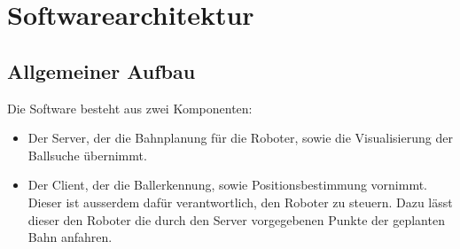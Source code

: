 
\chapter{Softwarearchitektur}
\label{cha:softwarearchitektur}

\section{Allgemeiner Aufbau}
\label{sec:allgemeiner-aufbau}

Die Software besteht aus zwei Komponenten:
\begin{itemize}
\item Der Server, der die Bahnplanung für die Roboter, sowie die
  Visualisierung der Ballsuche übernimmt.
\item Der Client, der die Ballerkennung, sowie Positionsbestimmung
  vornimmt. Dieser ist ausserdem dafür verantwortlich, den Roboter zu
  steuern. Dazu lässt dieser den Roboter die durch den Server vorgegebenen
  Punkte der geplanten Bahn anfahren. 
\end{itemize}


